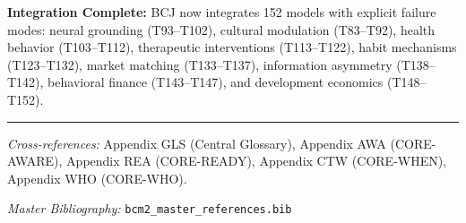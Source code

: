 \begin{tcolorbox}[colback=green!5!white, colframe=green!75!black,
    title=Complete Framework: 152 Theorems Across 29 Categories]
\textbf{Integration Complete:} BCJ now integrates 152 models with explicit failure modes: neural grounding (T93--T102), cultural modulation (T83--T92), health behavior (T103--T112), therapeutic interventions (T113--T122), habit mechanisms (T123--T132), market matching (T133--T137), information asymmetry (T138--T142), behavioral finance (T143--T147), and development economics (T148--T152).
\end{tcolorbox}



\vspace{1em}
\hrule
\vspace{0.5em}

\noindent\textit{Cross-references:}
Appendix GLS (Central Glossary),
Appendix AWA (CORE-AWARE),
Appendix REA (CORE-READY),
Appendix CTW (CORE-WHEN),
Appendix WHO (CORE-WHO).

\noindent\textit{Master Bibliography:} \texttt{bcm2\_master\_references.bib}

